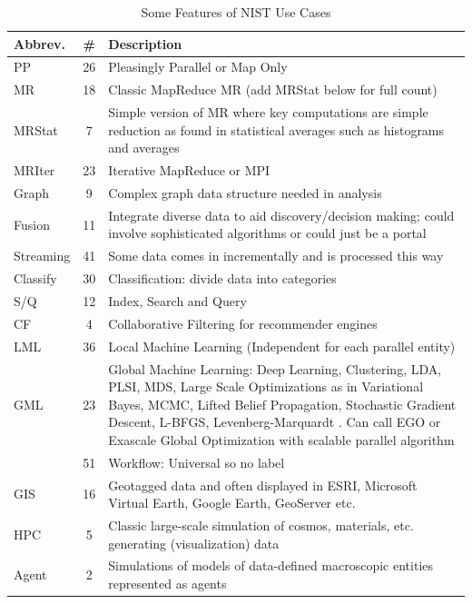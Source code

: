 \documentclass{acm_proc_article-sp}
\begin{document}
\begin{table}[t]
\centering
\caption{Some Features of NIST Use Cases}
\label{Table2}
\begin{tabular}{|p{1.5cm}|c|p{5.75cm}|} \hline
\textbf{Abbrev. } & \textbf{\#} & \textbf{Description} \\ \hline
PP & 26 & Pleasingly Parallel or Map Only \\ \hline
MR & 18 & Classic MapReduce MR (add MRStat below for full count) \\ \hline
MRStat & 7 & Simple version of MR where key computations are simple reduction as found in statistical averages such as histograms and averages  \\ \hline
MRIter & 23 & Iterative MapReduce or MPI \\ \hline
Graph & 9 & Complex graph data structure needed in analysis \\ \hline
Fusion & 11 & Integrate diverse data to aid discovery/decision making; could involve sophisticated algorithms or could just be a portal \\ \hline
Streaming & 41 &Some data comes in incrementally and is processed this way \\ \hline
Classify & 30 & Classification: divide data into categories \\ \hline
S/Q & 12 & Index, Search and Query \\ \hline
CF & 4 & Collaborative Filtering for recommender engines \\ \hline
LML & 36 & Local Machine Learning (Independent for each parallel entity) \\ \hline
GML & 23 & Global Machine Learning: Deep Learning, Clustering, LDA, PLSI, MDS, Large Scale Optimizations as in Variational Bayes, MCMC, Lifted Belief Propagation, Stochastic Gradient Descent, L-BFGS, Levenberg-Marquardt . Can call EGO or Exascale Global Optimization with scalable parallel algorithm \\ \hline
    & 51 &Workflow: Universal so no label \\ \hline
GIS & 16 & Geotagged data and often displayed in ESRI, Microsoft Virtual Earth, Google Earth, GeoServer etc. \\ \hline
HPC & 5 & Classic large-scale simulation of cosmos, materials, etc. generating (visualization) data \\ \hline
Agent & 2 & Simulations of models of data-defined macroscopic entities represented as agents \\ 
\hline\end{tabular}
\end{table}
\end{document}
